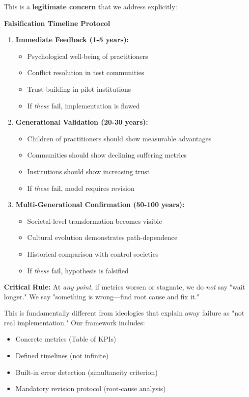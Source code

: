 \documentclass[11pt,a4paper]{article}
\theoremstyle{definition}
\theoremstyle{remark}
\begin{document}
\begin{small}
This is a \textbf{legitimate concern} that we address explicitly:

\begin{mdframed}[backgroundcolor=green!5]
\textbf{Falsification Timeline Protocol}

\begin{enumerate}
\item \textbf{Immediate Feedback (1-5 years):}
\begin{itemize}
\item Psychological well-being of practitioners
\item Conflict resolution in test communities
\item Trust-building in pilot institutions
\item If \textit{these} fail, implementation is flawed
\end{itemize}

\item \textbf{Generational Validation (20-30 years):}
\begin{itemize}
\item Children of practitioners should show measurable advantages
\item Communities should show declining suffering metrics
\item Institutions should show increasing trust
\item If \textit{these} fail, model requires revision
\end{itemize}

\item \textbf{Multi-Generational Confirmation (50-100 years):}
\begin{itemize}
\item Societal-level transformation becomes visible
\item Cultural evolution demonstrates path-dependence
\item Historical comparison with control societies
\item If \textit{these} fail, hypothesis is falsified
\end{itemize}
\end{enumerate}

\textbf{Critical Rule:} At \textit{any point}, if metrics worsen or stagnate, we do \textit{not} say "wait longer." We say "something is wrong—find root cause and fix it."

This is fundamentally different from ideologies that explain away failure as "not real implementation." Our framework includes:
\begin{itemize}
\item Concrete metrics (Table of KPIs)
\item Defined timelines (not infinite)
\item Built-in error detection (simultaneity criterion)
\item Mandatory revision protocol (root-cause analysis)
\end{itemize}


\end{mdframed}
\end{small}
\end{document}
